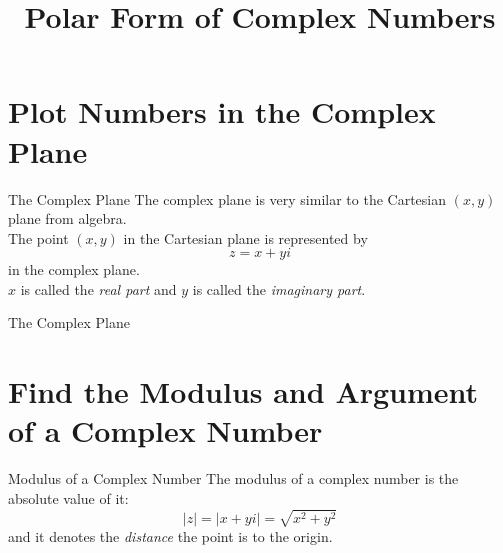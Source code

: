 \documentclass[t,usenames,dvipsnames]{beamer}
\title{Polar Form of Complex Numbers}
\author{}
\date{}
\begin{document}
\begin{frame}
    \titlepage
\end{frame}

\section{Plot Numbers in the Complex Plane}

\begin{frame}{The Complex Plane}
    The complex plane is very similar to the Cartesian $(x,y)$ plane from algebra. \newline\\
    
    The point $(x,y)$ in the Cartesian plane is represented by \alert{\[z = x + yi\]} in the complex plane.  \newline\\
    
    $x$ is called the \emph{real part} and $y$ is called the \emph{imaginary part}.
\end{frame}

\begin{frame}{The Complex Plane}
\end{frame}

\section{Find the Modulus and Argument of a Complex Number}

\begin{frame}{Modulus of a Complex Number}
    The \alert{modulus} of a complex number is the absolute value of it:
    \[
    |z| = |x + yi| = \sqrt{x^2+y^2}
    \]
    and it denotes the \emph{distance} the point is to the origin.
\end{frame}
\end{document}
